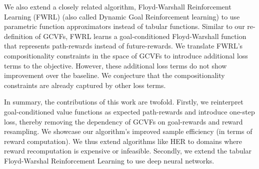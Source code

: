 We also extend a closely related algorithm, Floyd-Warshall Reinforcement
Learning (FWRL) \citep{kaelbling1993learning} (also called Dynamic Goal
Reinforcement learning) to use parametric
function approximators instead of tabular functions. Similar to our
re-definition of GCVFs, FWRL learns a goal-conditioned Floyd-Warshall function
that represents path-rewards instead of future-rewards.
We translate FWRL's compositionality constraints in the space of GCVFs to introduce
additional loss terms to the objective. However, these additional loss
terms do not show improvement over the baseline. We conjecture that the
compositionality constraints are already captured by other loss terms. 

In summary, the  contributions of this work are twofold. Firstly, we
reinterpret goal-conditioned value functions as expected path-rewards
and introduce one-step loss, thereby removing the dependency of GCVFs on
goal-rewards and reward resampling. We showcase our algorithm's
improved sample efficiency (in  terms of reward computation). We thus
extend algorithms like HER to domains where reward recomputation is
expensive or infeasible.
Secondly, we extend the tabular Floyd-Warshal Reinforcement Learning to
use deep neural networks. 



